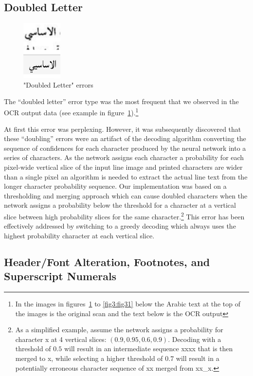 \subsection{Doubled Letter}

\begin{figure}
	\includegraphics[height=3cm]{images/image20.png}
	\caption{"Doubled Letter" errors}
	\label{fig3:fig4}
\end{figure}

The “doubled letter” error type was the most frequent that we observed in the
OCR output data (see example in figure~\ref{fig3:fig4}).\footnote{In the images
in figures~\ref{fig3:fig4} to \ref{fig3:fig31}  below the Arabic text at the top
of the images is the original scan and the text below is the OCR output}
                   
At first this error was perplexing. However, it was subsequently discovered
that these “doubling” errors were an artifact of the decoding algorithm
converting the sequence of confidences for each character produced by the
neural network into a series of characters. As the network assigns each
character a probability for each pixel-wide vertical slice of the input line
image and printed characters are wider than a single pixel an algorithm is
needed to extract the actual line text from the longer character probability
sequence. Our implementation was based on a thresholding and merging approach
which can cause doubled characters when the network assigns a probability below
the threshold for a character at a vertical slice between high probability
slices for the same character.\footnote{As a simplified example, assume the
network assigns a probability for character x at 4 vertical slices: $(0.9, 0.95,
0.6, 0.9)$. Decoding with a threshold of $0.5$ will result in an intermediate
sequence xxxx that is then merged to x, while selecting a higher threshold of
$0.7$ will result in a potentially erroneous character sequence of xx merged from
xx\_x.} This error has been effectively addressed by switching to a greedy
decoding which always uses the highest probability character at each vertical
slice.

\subsection{Header/Font Alteration, Footnotes, and Superscript Numerals}


